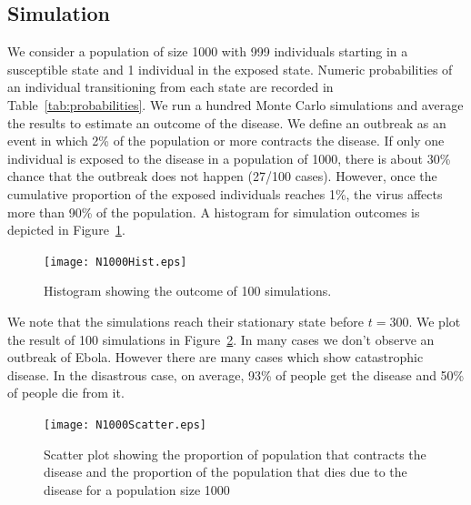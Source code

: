 \subsection{Simulation}
We consider a population of size 1000 with 999 individuals starting in a susceptible state and 1 individual in the exposed state. Numeric probabilities of an individual transitioning from each state are recorded in Table~\ref{tab:probabilities}. We run a hundred Monte Carlo simulations and average the results to estimate an outcome of the disease. We define an outbreak as an event in which 2\% of the population or more contracts the disease. If only one individual is exposed to the disease in a population of 1000, there is about 30\% chance that the outbreak does not happen (27/100 cases). However, once the cumulative proportion of the exposed individuals reaches 1\%, the virus affects more than 90\% of the population. A histogram for simulation outcomes is depicted in Figure~\ref{fig:Hist}.
%
%
%
%
%
%
\begin{figure}[h!]
\begin{center}
\texttt{[image: N1000Hist.eps]}
\end{center}
\caption{Histogram showing the outcome of 100 simulations.}
\label{fig:Hist}
\end{figure}


We note that the simulations reach their stationary state before $t = 300$. We plot the result of 100 simulations in Figure~\ref{fig:Scatter}. In many cases we don't observe an outbreak of Ebola. However there are many cases which show catastrophic disease. In the disastrous case, on average, 93\% of people get the disease and 50\% of people die from it. 

 
\begin{figure}[h!]
\begin{center}
\texttt{[image: N1000Scatter.eps]}
\end{center}
\caption{Scatter plot showing the proportion of population that contracts the disease and the proportion of the population that dies due to the disease for a population size 1000 }%
\label{fig:Scatter}
\end{figure}

